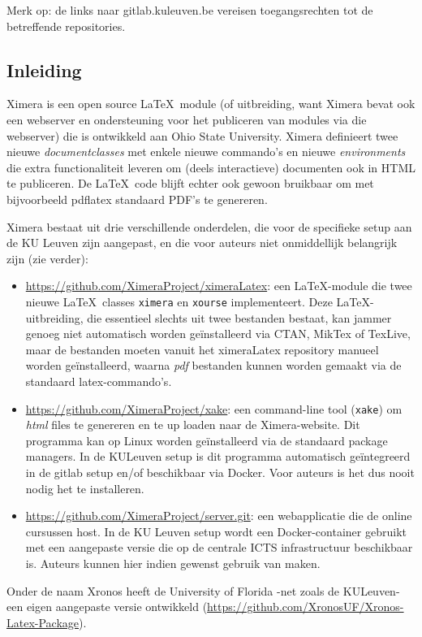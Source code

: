 \documentclass{ximera}
\begin{document}
\label{act:ximeraArchitectuur}
    \author{Wim Obbels}

Merk op: de links naar gitlab.kuleuven.be vereisen toegangsrechten tot de betreffende repositories.

\subsection{Inleiding}


Ximera is een open source \LaTeX\  module (of uitbreiding, want Ximera bevat ook een webserver en ondersteuning voor het publiceren van modules via die webserver) die is ontwikkeld aan Ohio State University. 
Ximera definieert twee nieuwe \textit{documentclasses} met enkele nieuwe commando's en nieuwe \textit{environments} die extra functionaliteit leveren om (deels interactieve)  documenten ook in HTML te publiceren. De \LaTeX\ code blijft echter ook gewoon bruikbaar om met bijvoorbeeld pdflatex standaard PDF's te genereren.

Ximera bestaat uit drie verschillende onderdelen, die voor de specifieke setup aan de KU Leuven zijn aangepast, en die voor auteurs niet onmiddellijk belangrijk zijn (zie verder):
\begin{itemize}
	\item  \url{https://github.com/XimeraProject/ximeraLatex}: een \LaTeX-module die twee nieuwe \LaTeX\ classes \verb|ximera| en \verb|xourse| implementeert. 
    Deze \LaTeX-uitbreiding, die essentieel slechts uit twee bestanden bestaat, kan jammer genoeg niet automatisch worden geïnstalleerd via CTAN, MikTex of TexLive, maar de bestanden moeten vanuit het ximeraLatex repository manueel worden geïnstalleerd, waarna \textit{pdf} bestanden kunnen worden gemaakt via de standaard latex-commando's.
	\item \url{https://github.com/XimeraProject/xake}: een command-line tool (\verb|xake|) om \textit{html} files te genereren en te up loaden naar de Ximera-website. Dit programma kan op Linux worden geïnstalleerd via de standaard package managers. 
    In de KULeuven setup is dit programma automatisch geïntegreerd in de gitlab setup en/of beschikbaar via Docker. Voor auteurs is het dus nooit nodig het te installeren.
	\item \url{https://github.com/XimeraProject/server.git}: een webapplicatie die de online cursussen host. 
    In de KU Leuven setup wordt een Docker-container gebruikt met een aangepaste versie die op de centrale ICTS infrastructuur beschikbaar is. Auteurs kunnen hier indien gewenst gebruik van maken.
\end{itemize}
Onder de naam Xronos heeft de University of Florida -net zoals de KULeuven- een eigen aangepaste versie ontwikkeld (\url{https://github.com/XronosUF/Xronos-Latex-Package}).
\end{document}
